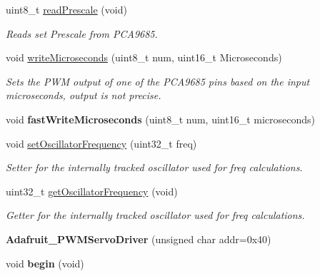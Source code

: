 \begin{DoxyCompactItemize}
uint8\+\_\+t \hyperlink{classAdafruit__PWMServoDriver_a52dbe6fa4fa4a98d3082f239d59ad5f1}{read\+Prescale} (void)
\begin{DoxyCompactList}\small\item\em Reads set Prescale from P\+C\+A9685. \end{DoxyCompactList}\item 
void \hyperlink{classAdafruit__PWMServoDriver_aa91cf057ec01505292401e4fdceb57ac}{write\+Microseconds} (uint8\+\_\+t num, uint16\+\_\+t Microseconds)
\begin{DoxyCompactList}\small\item\em Sets the P\+WM output of one of the P\+C\+A9685 pins based on the input microseconds, output is not precise. \end{DoxyCompactList}\item 
\mbox{\label{classAdafruit__PWMServoDriver_a0fa586b534db37ebcc5d86f6baebdb10}} 
void {\bfseries fast\+Write\+Microseconds} (uint8\+\_\+t num, uint16\+\_\+t microseconds)
\item 
void \hyperlink{classAdafruit__PWMServoDriver_ac725dd6b0d24d087586a854e81bcf6b3}{set\+Oscillator\+Frequency} (uint32\+\_\+t freq)
\begin{DoxyCompactList}\small\item\em Setter for the internally tracked oscillator used for freq calculations. \end{DoxyCompactList}\item 
uint32\+\_\+t \hyperlink{classAdafruit__PWMServoDriver_ae4017d3cbbda98a0bb41efcf2c1fcf30}{get\+Oscillator\+Frequency} (void)
\begin{DoxyCompactList}\small\item\em Getter for the internally tracked oscillator used for freq calculations. \end{DoxyCompactList}\item 
\mbox{\label{classAdafruit__PWMServoDriver_a029cc2c5f5260fd02deb95ca15771690}} 
{\bfseries Adafruit\+\_\+\+P\+W\+M\+Servo\+Driver} (unsigned char addr=0x40)
\item 
\mbox{\label{classAdafruit__PWMServoDriver_aef401eaad3c34222ac916eb7bd936bc2}} 
void {\bfseries begin} (void)
\item 
\mbox{\label{classAdafruit__PWMServoDriver_ac976f52233a75a4bd0eb6f2ce9b82b7f}} 

\end{DoxyCompactItemize}
